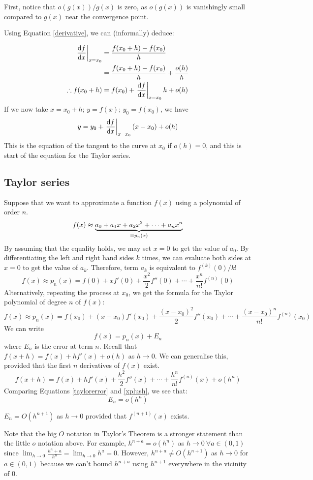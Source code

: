First, notice that \(o(g(x))/g(x)\) is zero, as \(o(g(x))\) is vanishingly small compared to \(g(x)\) near the convergence point.

Using Equation \eqref{derivative}, we can (informally) deduce:

\begin{align*}
	\eval{\frac{\dd{f}}{\dd{x}}}_{x=x_0} & = \frac{f(x_0 + h) - f(x_0)}{h}                          \\
	                                     & = \frac{f(x_0 + h) - f(x_0)}{h} + \frac{o(h)}{h}         \\
	\therefore f(x_0 + h)                & = f(x_0) + \eval{\frac{\dd{f}}{\dd{x}}}_{x=x_0} h + o(h)
\end{align*}
If we now take \(x=x_0+h;\,y=f(x);\,y_0=f(x_0)\), we have
\[
	y = y_0 + \eval{\frac{\dd{f}}{\dd{x}}}_{x=x_0}(x - x_0) + o(h)
\]
This is the equation of the tangent to the curve at \(x_0\) if \(o(h)=0\), and this is start of the equation for the Taylor series.

\subsection{Taylor series}
Suppose that we want to approximate a function \(f(x)\) using a polynomial of order \(n\).
\[
	f(x) \approx \underbrace{a_0 + a_1 x + a_2 x^2 + \cdots + a_n x^n}_{\mathclap{\equiv p_n(x)}}
\]
By assuming that the equality holds, we may set \(x=0\) to get the value of \(a_0\).
By differentiating the left and right hand sides \(k\) times, we can evaluate both sides at \(x=0\) to get the value of \(a_k\).
Therefore, term \(a_k\) is equivalent to \(f^{(k)}(0)/k!
\)
\[
	f(x) \approx p_n(x) = f(0) + xf'(0) + \frac{x^2}{2}f''(0) + \cdots + \frac{x^n}{n!}f^{(n)}(0)
\]
Alternatively, repeating the process at \(x_0\), we get the formula for the Taylor polynomial of degree \(n\) of \(f(x)\):
\[
	f(x) \approx p_n(x) = f(x_0) + (x-x_0)f'(x_0) + \frac{(x-x_0)^2}{2}f''(x_0) + \cdots + \frac{(x-x_0)^n}{n!}f^{(n)}(x_0)
\]
We can write
\begin{equation}\label{taylorerror}
	f(x) = p_n(x) + E_n
\end{equation}
where \(E_n\) is the error at term \(n\).
Recall that \(f(x+h) = f(x) + hf'(x) + o(h)\) as \(h \to 0\).
We can generalise this, provided that the first \(n\) derivatives of \(f(x)\) exist.
\begin{equation}\label{xplush}
	f(x+h) = f(x) + hf'(x) + \frac{h^2}{2}f''(x) + \cdots + \frac{h^n}{n!}f^{(n)}(x) + o(h^n)
\end{equation}
Comparing Equations \eqref{taylorerror} and \eqref{xplush}, we see that:
\[
	E_n = o(h^n)
\]
\begin{theorem}
	\(E_n = O(h^{n+1})\) as \(h \to 0\) provided that \(f^{(n+1)}(x)\) exists.
\end{theorem}
Note that the big \(O\) notation in Taylor's Theorem is a stronger statement than the little \(o\) notation above.
For example, \(h^{n+a}=o(h^n)\) as \(h \to 0\ \forall a \in (0, 1)\) since \(\lim_{h\to 0} \frac{h^n+a}{h^n} = \lim_{h\to 0} h^a = 0\).
However, \(h^{n+a} \neq O(h^{n+1})\) as \(h \to 0\) for \(a \in (0, 1)\) because we can't bound \(h^{n+a}\) using \(h^{n+1}\) everywhere in the vicinity of \(0\).

